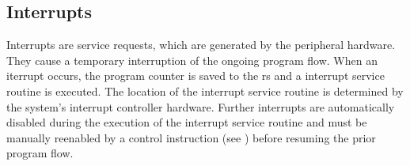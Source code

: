 \subsection{Interrupts}
\label{reset:irq}
Interrupts are service requests, which are generated by the peripheral hardware. They cause
a temporary interruption of the ongoing program flow. 
When an iterrupt occurs, the program counter is saved to the \gls{rs} and a interrupt service
routine is executed. The location of the interrupt service routine is determined by the system's
interrupt controller hardware. Further interrupts are automatically disabled during the execution
of the interrupt service routine and must be manually reenabled by a control instruction
(see ) before resuming the prior program flow.
